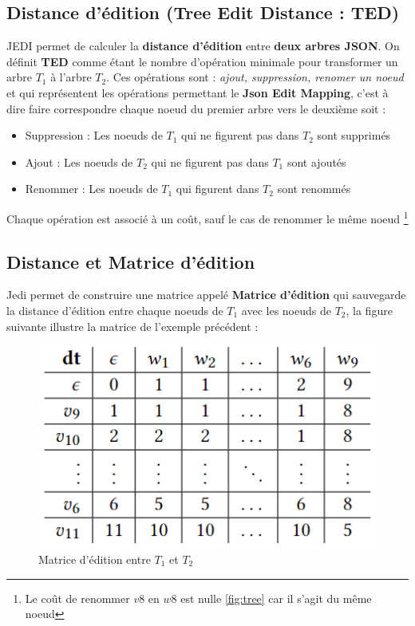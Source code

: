         \subsection{Distance d'édition (Tree Edit Distance : TED)}
            JEDI permet de calculer la \textbf{distance d'édition} entre \textbf{deux arbres JSON}. On définit \textbf{TED} comme étant le nombre d'opération minimale 
            pour transformer un arbre \textbf{$T_1$} à l'arbre \textbf{$T_2$}. Ces opérations sont :  \emph{ajout, suppression, renomer un noeud} et qui représentent les opérations 
            permettant le \textbf{Json Edit Mapping}, c'est à dire faire correspondre chaque noeud du premier arbre vers le deuxième soit : 
            \begin{itemize}
                \item [\textbullet] Suppression : Les noeuds de $T_1$ qui ne figurent pas dans $T_2$ sont supprimés
                \item [\textbullet] Ajout : Les noeuds de $T_2$ qui ne figurent pas dans $T_1$ sont ajoutés
                \item [\textbullet] Renommer : Les noeuds de $T_1$ qui figurent dans $T_2$ sont renommés
            \end{itemize} 
           
            
            Chaque opération est associé à un coût, sauf le cas de renommer le même noeud \footnote{ Le coût de renommer $v8$ en $w8$ est nulle \ref{fig:tree} car il s'agit du même noeud}
        \subsection{Distance et Matrice d'édition}
            Jedi permet de construire une matrice appelé \textbf{Matrice d'édition} qui sauvegarde la distance d'édition entre chaque noeuds de $T_1$ avec les noeuds de $T_2$, 
            la figure suivante illustre la matrice de l'exemple précédent : 
            \begin{figure}[H]
                \centering
                \includegraphics[scale=0.5]{Photos/tree_edit_matrix.PNG}
                \caption{Matrice d'édition entre $T_1$ et $T_2$}
                \label{fig:tree_edit_matrix}
            \end{figure}

